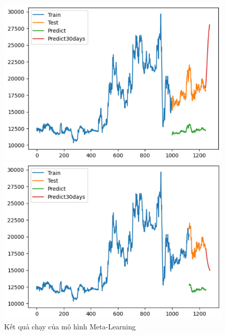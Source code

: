 \begin{figure}[H]
\begin{minipage}{0.15\textwidth}
    \includegraphics[width=1\textwidth]{resources/chapter-5/result/EXB_LSTM_8_2.jpg}
    \end{minipage}
    \hfill
        \begin{minipage}{0.15\textwidth}
    \centering
    \includegraphics[width=1\textwidth]{resources/chapter-5/result/EXB_LSTM_9_1.jpg}
    \end{minipage}
    \hfill
    
    \caption{Kết quả chạy của mô hình Meta-Learning}
    \label{fig:lstm_result}
\end{figure}

